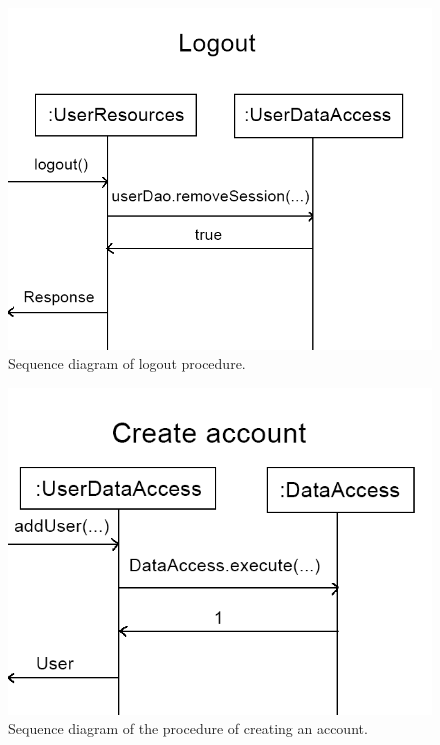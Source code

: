 \documentclass{article}
\begin{document}
\begin{figure}[h]
  \centering
  \includegraphics[scale=0.3]{seqdiagram3.png}
  \caption{Sequence diagram of logout procedure.}
  \label{fig:seq3}
\end{figure}

\begin{figure}[h]
  \centering
  \includegraphics[scale=0.3]{seqdiagram4.png}
  \caption{Sequence diagram of the procedure of creating an account.}
  \label{fig:seq4}
\end{figure}
\end{document}
